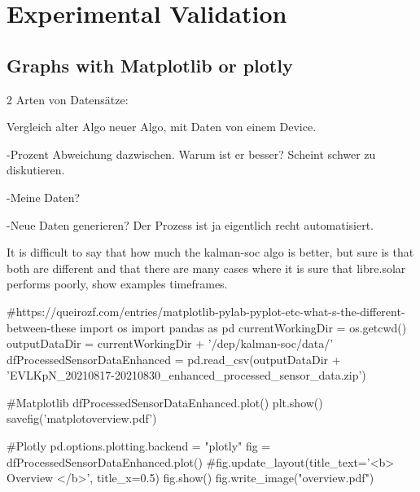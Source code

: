\chapter{Experimental Validation}


\section{Graphs with Matplotlib or plotly}

2 Arten von Datensätze: 



Vergleich alter Algo neuer Algo, mit Daten von einem Device. 

-Prozent Abweichung dazwischen. Warum ist er besser? Scheint schwer zu diskutieren.



-Meine Daten? 



-Neue Daten generieren? Der Prozess ist ja eigentlich recht automatisiert. 



It is difficult to say that how much the kalman-soc algo is better, but sure is that both are different and that there are many cases where it is sure that libre.solar performs poorly, show examples timeframes.


\begin{pylabcode}
#https://queirozf.com/entries/matplotlib-pylab-pyplot-etc-what-s-the-different-between-these
import os 
import pandas as pd
currentWorkingDir =  os.getcwd()
outputDataDir = currentWorkingDir + '/dep/kalman-soc/data/'
dfProcessedSensorDataEnhanced = pd.read_csv(outputDataDir + 'EVLKpN_20210817-20210830_enhanced_processed_sensor_data.zip')  

#Matplotlib
dfProcessedSensorDataEnhanced.plot()
plt.show()
savefig('matplotoverview.pdf')

#Plotly
pd.options.plotting.backend = "plotly"
fig = dfProcessedSensorDataEnhanced.plot()
#fig.update_layout(title_text='<b> Overview  </b>', title_x=0.5)
fig.show()
fig.write_image("overview.pdf")
\end{pylabcode}
	

%
%

